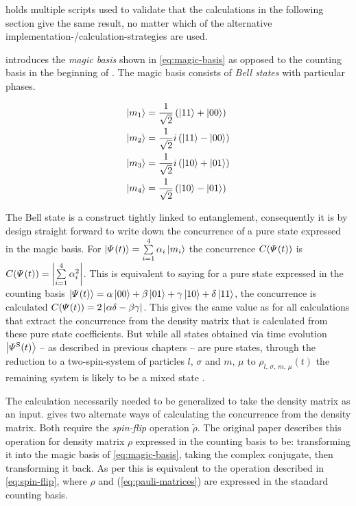  holds multiple scripts used to validate that the calculations in the following section give the same result, no matter which of the alternative implementation-/calculation-strategies are used.

\cite{concurrenceMainPaper} introduces the \emph{magic basis} shown in \autoref{eq:magic-basis} as opposed to the counting basis in the beginning of . 
The magic basis consists of \emph{Bell states} with particular phases.

\begin{equation}
    \label{eq:magic-basis}
    \begin{split}
        \ketN[m_1] &= \frac{1}{\sqrt{2}} \left(\ketN[11] + \ketN[00]\right) \\
        \ketN[m_2] &= \frac{1}{\sqrt{2}} i \left(\ketN[11] - \ketN[00]\right) \\
        \ketN[m_3] &= \frac{1}{\sqrt{2}} i \left(\ketN[10] + \ketN[01]\right) \\
        \ketN[m_4] &= \frac{1}{\sqrt{2}} \left(\ketN[10] - \ketN[01]\right) \\
    \end{split}
\end{equation}

The Bell state is a construct tightly linked to entanglement, consequently it is by design straight forward to write down the concurrence of a pure state expressed in the magic basis.
For $\ketN[\psiOfT] = \sum\limits_{i=1}^4 \alpha_i \ketN[m_i]$ the concurrence $C(\psiOfT)$ is $C(\psiOfT) = \left|\sum\limits_{i=1}^4 \alpha_i^2 \right|$.
This is equivalent to saying for a pure state expressed in the counting basis $\ketN[\psiOfT] = \alpha \ketN[00] +  \beta \ketN[01] +  \gamma \ketN[10] +  \delta\ketN[11]$, the concurrence is calculated $C(\psiOfT) = 2 \left|\alpha \delta - \beta \gamma\right|$.
This gives the same value as for all calculations that extract the concurrence from the density matrix that is calculated from these pure state coefficients.
But while all states obtained via time evolution $\ketN[{\psiOfT[\schroedingerPicture]}]$ -- as described in previous chapters -- are pure states, through the reduction to a \glqq two-spin-system\grqq{} of particles $l,\,\sigma$ and $m,\,\mu$ to $\rho_{l,\,\sigma,\,m,\,\mu} (t)$ the remaining system is likely to be a mixed state \cite{mixedStateFromPureState}.

The calculation necessarily needed to be generalized to take the density matrix as an input.
\cite{concurrenceRewording} gives two alternate ways of calculating the concurrence from the density matrix.
Both require the \emph{spin-flip} operation $\tilde{\rho}$.
The original paper \cite{concurrenceMainPaper} describes this operation for density matrix $\rho$ expressed in the counting basis to be: transforming it into the magic basis of \autoref{eq:magic-basis}, taking the complex conjugate, then transforming it back.
As per \cite{concurrenceRewording} this is equivalent to the operation described in \autoref{eq:spin-flip}, where $\rho$ and  (\autoref{eq:pauli-matrices}) are expressed in the standard counting basis.

